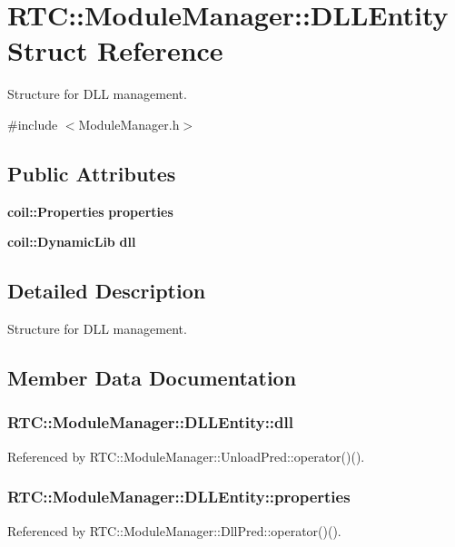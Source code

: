 \section{RTC::ModuleManager::DLLEntity Struct Reference}
\label{structRTC_1_1ModuleManager_1_1DLLEntity}


Structure for DLL management.  




{\ttfamily \#include $<$ModuleManager.h$>$}

\subsection*{Public Attributes}
\begin{DoxyCompactItemize}
\item 
{\bf coil::Properties} {\bf properties}
\item 
{\bf coil::DynamicLib} {\bf dll}
\end{DoxyCompactItemize}


\subsection{Detailed Description}
Structure for DLL management. 

\subsection{Member Data Documentation}
\subsubsection[{dll}]{ {\bf RTC::ModuleManager::DLLEntity::dll}}\label{structRTC_1_1ModuleManager_1_1DLLEntity_afe210678e87af07ccd3d5e46d5bfaa39}


Referenced by RTC::ModuleManager::UnloadPred::operator()().

\subsubsection[{properties}]{ {\bf RTC::ModuleManager::DLLEntity::properties}}\label{structRTC_1_1ModuleManager_1_1DLLEntity_a9e03f69e5fef19e24e6eeaa4a4a45835}


Referenced by RTC::ModuleManager::DllPred::operator()().

